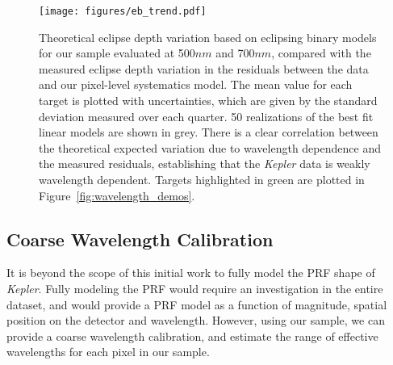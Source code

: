 \documentclass[iop]{emulateapj}
\newcommand{\kepler}{\emph{Kepler}\xspace}
\begin{document}
\begin{figure}
    \centering
    \texttt{[image: figures/eb\_trend.pdf]}
    \caption{Theoretical eclipse depth variation based on eclipsing binary models for our sample evaluated at 500$nm$ and 700$nm$, compared with the measured eclipse depth variation in the residuals between the data and our pixel-level systematics model. The mean value for each target is plotted with uncertainties, which are given by the standard deviation measured over each quarter. 50 realizations of the best fit linear models are shown in grey. There is a clear correlation between the theoretical expected variation due to wavelength dependence and the measured residuals, establishing that the \kepler data is weakly wavelength dependent. Targets highlighted in green are plotted in Figure~\ref{fig:wavelength_demos}.}
    \label{fig:correlation}
\end{figure}


\subsection{Coarse Wavelength Calibration}
\label{sec:calibrate}

It is beyond the scope of this initial work to fully model the PRF shape of \kepler. Fully modeling the PRF would require an investigation in the entire dataset, and would provide a PRF model as a function of magnitude, spatial position on the detector and wavelength. However, using our sample, we can provide a coarse wavelength calibration, and estimate the range of effective wavelengths for each pixel in our sample. %

\end{document}

